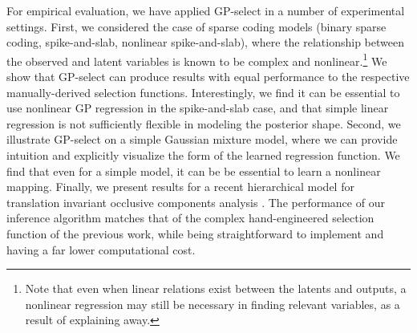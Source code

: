 For empirical evaluation, we have applied GP-select in a number of experimental settings.
First, we considered the case of sparse coding models (binary sparse coding,
spike-and-slab, nonlinear spike-and-slab), where the relationship between the
observed and latent variables is known to be complex and nonlinear.\footnote{Note that
 even when linear relations exist between the latents and outputs, a nonlinear
regression may still be necessary in finding relevant variables,
as a result of explaining away.}
%
We show that GP-select can produce results with equal performance to the respective manually-derived selection functions.
%
Interestingly, we find it can be essential to use nonlinear GP regression
in the spike-and-slab case, and that simple linear regression is not
sufficiently flexible in modeling the posterior shape.
%
Second, we illustrate GP-select on a simple Gaussian mixture model,
where we can provide intuition and explicitly visualize the form of the learned regression function.
We find that even for a simple model, it can be be essential to learn a nonlinear mapping.
%
Finally, we present results
for a recent hierarchical model for translation invariant occlusive components analysis
\citep{DaiLucke2014}.
The performance of our inference algorithm matches that of the complex
hand-engineered selection function of the previous work, while being straightforward
to implement and having a far lower computational cost.




